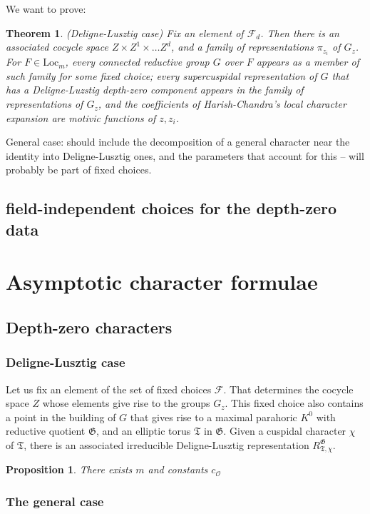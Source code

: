 \documentclass[12pt]{amsart}
\newcommand{\cF}{\mathcal{F}}
\newcommand{\cO}{{\mathcal O}}
\newcommand{\Loc}{\mathrm{Loc}}
\def\cO{\mathcal{O}}
\def\cF{\mathcal{F}}
\newcommand{\fG}{\mathfrak G}
\newcommand{\fT}{\mathfrak T}
\theoremstyle{plain}
\newtheorem{theorem}[thm]{Theorem}
\newtheorem{prop}[thm]{Proposition}
\theoremstyle{definition}
\begin{document}
We want to prove: 
\begin{theorem} (Deligne-Lusztig case) Fix an element of $\cF_d$. 
Then there is an associated cocycle space $Z\times Z^1\times \dots Z^d$, and a family of representations $\pi_{z_i}$ of $G_z$. 
For $F\in \Loc_m$, every connected reductive group $G$ over $F$ appears as a member  of such  family for some fixed choice; 
every supercuspidal representation of $G$ that has a Deligne-Luzstig depth-zero component 
appears in the family of representations of $G_z$, and 
the coefficients of Harish-Chandra's local character expansion are motivic functions of 
$z, z_i$. 
\end{theorem}

General case: should include the decomposition of a general character near the identity into Deligne-Lusztig ones, and the parameters that account for this -- will probably be part of fixed choices. 

\subsection{field-independent choices for the depth-zero data}




\section{Asymptotic character formulae}

\subsection{Depth-zero characters}
\subsubsection{Deligne-Lusztig case} Let us fix an element of the set of fixed choices $\cF$. 
That determines the cocycle space $Z$ whose elements give rise to the groups $G_z$. This fixed 
choice also contains a point in the building of $G$ that gives rise to a maximal parahoric  $K^0$
 with reductive quotient $\fG$, and an elliptic torus $\fT$ in $\fG$. 
Given a cuspidal character $\chi$ of $\fT$, there is an associated irreducible Deligne-Lusztig representation $R_{\fT, \chi}^\fG$. 
\begin{prop} There exists $m$ and constants $c_{\cO}$
\end{prop}

\subsubsection{The general case}
\end{document}
